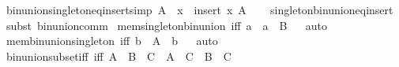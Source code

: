 \begin{isabellebody}
{\isafoldproof}%
%
\isadelimproof
\isanewline
%
\endisadelimproof
\isanewline
{}\isamarkupfalse%
\ bin{\isacharunderscore}{\kern0pt}union{\isacharunderscore}{\kern0pt}singleton{\isacharunderscore}{\kern0pt}eq{\isacharunderscore}{\kern0pt}insert{\isacharbrackleft}{\kern0pt}simp{\isacharbrackright}{\kern0pt}{\isacharcolon}{\kern0pt}\ {\isachardoublequoteopen}A\ {\isasymunion}\ {\isacharbraceleft}{\kern0pt}x{\isacharbraceright}{\kern0pt}\ {\isacharequal}{\kern0pt}\ insert\ x\ A{\isachardoublequoteclose}\isanewline
%
\isadelimproof
\ \ %
\endisadelimproof
%
\isatagproof
{}\isamarkupfalse%
\ singleton{\isacharunderscore}{\kern0pt}bin{\isacharunderscore}{\kern0pt}union{\isacharunderscore}{\kern0pt}eq{\isacharunderscore}{\kern0pt}insert\ \isamarkupfalse%
\ {\isacharparenleft}{\kern0pt}subst\ bin{\isacharunderscore}{\kern0pt}union{\isacharunderscore}{\kern0pt}comm{\isacharparenright}{\kern0pt}%
\endisatagproof
{\isafoldproof}%
%
\isadelimproof
\isanewline
%
\endisadelimproof
\isanewline
{}\isamarkupfalse%
\ mem{\isacharunderscore}{\kern0pt}singleton{\isacharunderscore}{\kern0pt}bin{\isacharunderscore}{\kern0pt}union\ {\isacharbrackleft}{\kern0pt}iff{\isacharbrackright}{\kern0pt}{\isacharcolon}{\kern0pt}\ {\isachardoublequoteopen}a\ {\isasymin}\ {\isacharbraceleft}{\kern0pt}a{\isacharbraceright}{\kern0pt}\ {\isasymunion}\ B{\isachardoublequoteclose}%
\isadelimproof
\ %
\endisadelimproof
%
\isatagproof
{}\isamarkupfalse%
\ auto%
\endisatagproof
{\isafoldproof}%
%
\isadelimproof
%
\endisadelimproof
\isanewline
\isanewline
{}\isamarkupfalse%
\ mem{\isacharunderscore}{\kern0pt}bin{\isacharunderscore}{\kern0pt}union{\isacharunderscore}{\kern0pt}singleton\ {\isacharbrackleft}{\kern0pt}iff{\isacharbrackright}{\kern0pt}{\isacharcolon}{\kern0pt}\ {\isachardoublequoteopen}b\ {\isasymin}\ A\ {\isasymunion}\ {\isacharbraceleft}{\kern0pt}b{\isacharbraceright}{\kern0pt}{\isachardoublequoteclose}%
\isadelimproof
\ %
\endisadelimproof
%
\isatagproof
{}\isamarkupfalse%
\ auto%
\endisatagproof
{\isafoldproof}%
%
\isadelimproof
%
\endisadelimproof
\isanewline
\isanewline
{}\isamarkupfalse%
\ bin{\isacharunderscore}{\kern0pt}union{\isacharunderscore}{\kern0pt}subset{\isacharunderscore}{\kern0pt}iff\ {\isacharbrackleft}{\kern0pt}iff{\isacharbrackright}{\kern0pt}{\isacharcolon}{\kern0pt}\ {\isachardoublequoteopen}A\ {\isasymunion}\ B\ {\isasymsubseteq}\ C\ {\isasymlongleftrightarrow}\ A\ {\isasymsubseteq}\ C\ {\isasymand}\ B\ {\isasymsubseteq}\ C{\isachardoublequoteclose}\isanewline

\end{isabellebody}
